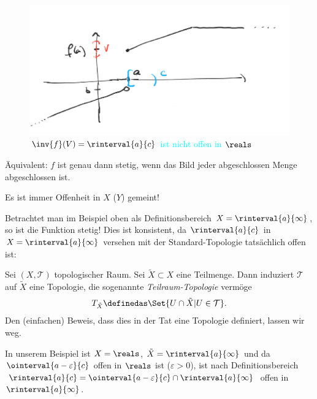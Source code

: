 \begin{figure}[H]
    \centering
    \includegraphics[width=0.8\linewidth]{figures/beispiel_urbild_offener_menge_unter_nicht_stetiger_abbildung_nicht_offen}
    \caption*{\textcolor{Cyan}{\( \inv{f}(V)=\rinterval{a}{c} \) ist nicht offen in \( \reals \)}}
    \label{fig:beispiel_urbild_offener_menge_unter_nicht_stetiger_abbildung_nicht_offen}
\end{figure}
\begin{bemerkung*}
    Äquivalent: \( f \) ist genau dann stetig, wenn das Bild jeder abgeschlossen Menge abgeschlossen ist.
\end{bemerkung*}
Es ist immer Offenheit in \( X \) (\bzw \( Y \)) gemeint!

Betrachtet man im Beispiel oben als Definitionsbereich \( X=\rinterval{a}{\infty} \), so ist die Funktion stetig! 
Dies ist konsistent, da \( \rinterval{a}{c} \) in \( X=\rinterval{a}{\infty} \) versehen mit der Standard-Topologie tatsächlich offen ist:
\begin{defsatz}
    Sei \( (X,\mathcal{T}) \) topologischer Raum. Sei \( \tilde{X}\subset X \) eine Teilmenge. Dann induziert \( \mathcal{T} \) auf \( \tilde{X}  \) eine Topologie, die sogenannte \emph{Teilraum-Topologie} vermöge
    \begin{align*}
        T_{\tilde{X}}\definedas \Set{U\cap \tilde{X}|U\in \mathcal{T}}.
    \end{align*}
    Den (einfachen) Beweis, dass dies in der Tat eine Topologie definiert, lassen wir weg.
\end{defsatz}

In unserem Beispiel ist \( X=\reals \), \( \tilde{X}=\rinterval{a}{\infty} \) und da \( \ointerval{a-\varepsilon}{c} \) offen in \( \reals \) ist (\( \varepsilon>0 \)), ist nach Definitionsbereich \( \rinterval{a}{c}=\ointerval{a-\varepsilon}{c}\cap \rinterval{a}{\infty} \) offen in \( \rinterval{a}{\infty} \).

